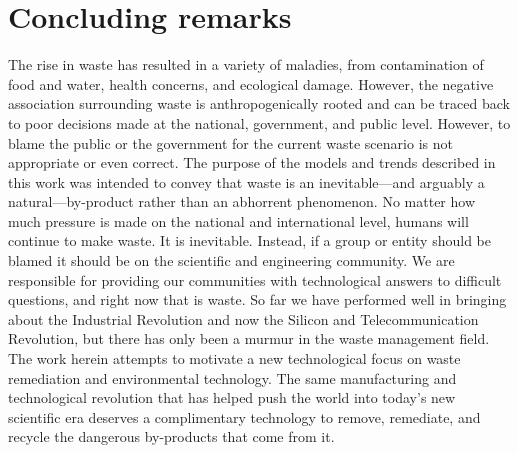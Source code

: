 \documentclass[../main/main]{subfiles}
\begin{document}
\section{Concluding remarks}
The rise in waste has resulted in a variety of maladies, from contamination of food and water, health concerns, and ecological damage. However, the negative association surrounding waste is anthropogenically rooted and can be traced back to poor decisions made at the national, government, and public level. However, to blame the public or the government for the current waste scenario is not appropriate or even correct. The purpose of the models and trends described in this work was intended to convey that waste is an inevitable---and arguably a natural---by-product rather than an abhorrent phenomenon. No matter how much pressure is made on the national and international level, humans will continue to make waste. It is inevitable. Instead, if a group or entity should be blamed it should be on the scientific and engineering community. We are responsible for providing our communities with technological answers to difficult questions, and right now that is waste. So far we have performed well in bringing about the Industrial Revolution and now the Silicon and Telecommunication Revolution, but there has only been a murmur in the waste management field. The work herein attempts to motivate a new technological focus on waste remediation and environmental technology. The same manufacturing and technological revolution that has helped push the world into today's new scientific era deserves a complimentary technology to remove, remediate, and recycle the dangerous by-products that come from it.

\printbibliography[title=References]

\setcounter{chapter}{0}

\renewcommand{\thetable}{\arabic{table}}
\renewcommand{\thefigure}{\arabic{figure}}

\renewcommand{\thechapter}{\arabic{chapter}}
\renewcommand{\thesection}{\arabic{section}}
\renewcommand{\thesubsection}{\arabic{section}.\arabic{subsection}}
\end{document}
